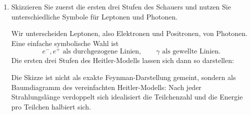 \documentclass[11pt,a4paper]{scrartcl}
\begin{document}
    \begin{enumerate}[label=(\alph*)]
        \item
            Skizzieren Sie zuerst die ersten drei Stufen des Schauers und nutzen Sie
            unterschiedliche Symbole für Leptonen und Photonen.

            \begin{calculationbox}
                Wir unterscheiden Leptonen, also Elektronen und Positronen, von Photonen.
                Eine einfache symbolische Wahl ist
                \[
                    e^-,e^+ \text{ als durchgezogene Linien},
                    \qquad
                    \gamma \text{ als gewellte Linien}.
                \]
                Die ersten drei Stufen des Heitler-Modells lassen sich dann so darstellen:

                \begin{center}
                \end{center}

                \begin{calculationbox}
                    Die Skizze ist nicht als exakte Feynman-Darstellung gemeint, sondern als
                    Baumdiagramm des vereinfachten Heitler-Modells: Nach jeder Strahlungslänge
                    verdoppelt sich idealisiert die Teilchenzahl und die Energie pro Teilchen
                    halbiert sich.
                \end{calculationbox}
            \end{calculationbox}


\end{enumerate}
\end{document}
